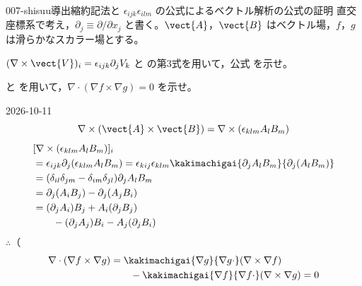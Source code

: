 \documentclass[uplatex,dvipdfmx,a4paper,11pt]{jsarticle}
\begin{document}
\begin{mondai}{007-shisuu}{導出}{縮約記法と $\epsilon_{ijk}\epsilon_{ilm}$ の公式によるベクトル解析の公式の証明}
直交座標系で考え，$\partial_j \equiv \partial/\partial x_j$ と書く。$\vect{A}$，$\vect{B}$ はベクトル場，$f$，$g$ は滑らかなスカラー場とする。
  \begin{shoumon}
    \item $(\nabla\times\vect{V})_i = \epsilon_{ijk}\partial_jV_k$ と  の第3式を用いて，公式  を示せ。
    \item {} と  を用いて，$\nabla\cdot(\nabla f\times\nabla g) = 0$ を示せ。
  \end{shoumon}
\begin{kotaeutsushi}{2026-10-11}
\[ \nabla\times(\vect{A}\times\vect{B})=\nabla\times(\epsilon_{klm}A_{l}B_{m}) \]
\begin{align*}
&[\nabla\times(\epsilon_{klm}A_{l}B_{m})]_{i}\\
&=\epsilon_{ijk}\partial_{j}(\epsilon_{klm}A_{l}B_{m})=\epsilon_{kij}\epsilon_{klm}\kakimachigai{\partial_{j}A_{l}B_{m}}{\partial_{j}(A_{l}B_{m})}\\
&=(\delta_{il}\delta_{jm}-\delta_{im}\delta_{jl})\partial_{j}A_{l}B_{m}\\
&=\partial_{j}(A_{i}B_{j})-\partial_{j}(A_{j}B_{i})\\
&=(\partial_{j}A_{i})B_{j}+A_{i}(\partial_{j}B_{j})\\
&\qquad-(\partial_{j}A_{j})B_{i}-A_{j}(\partial_{j}B_{i})
\end{align*}
$\therefore$（
\begin{align*}
\nabla\cdot(\nabla f\times\nabla g)&=\kakimachigai{\nabla g}{\nabla g\cdot}(\nabla\times\nabla f)\\
&\qquad-\kakimachigai{\nabla f}{\nabla f\cdot}(\nabla\times\nabla g)=0
\end{align*}
\end{kotaeutsushi}
\begin{kizuki}

\end{kizuki}
\end{mondai}
\end{document}
